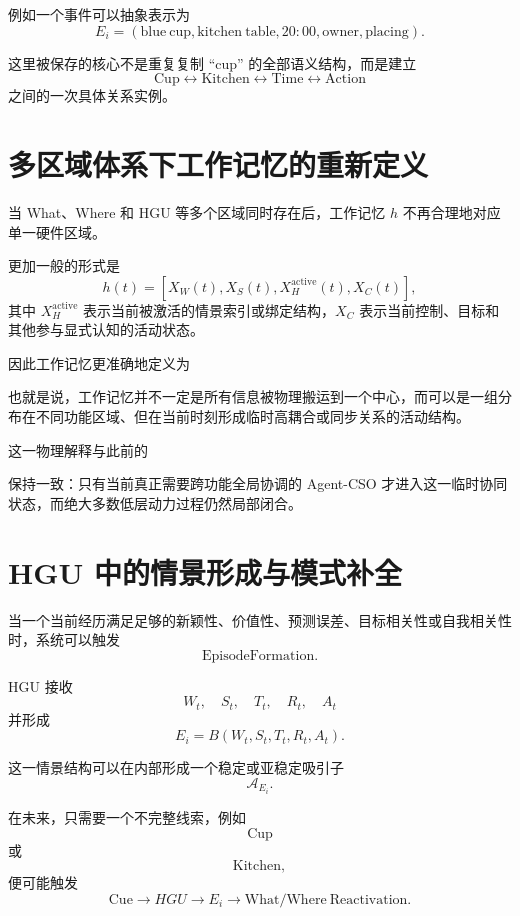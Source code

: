 例如一个事件可以抽象表示为
\[
E_i=
(
\mathrm{blue\ cup},
\mathrm{kitchen\ table},
20{:}00,
\mathrm{owner},
\mathrm{placing}
).
\]

这里被保存的核心不是重复复制 ``cup'' 的全部语义结构，而是建立
\[
\mathrm{Cup}
\leftrightarrow
\mathrm{Kitchen}
\leftrightarrow
\mathrm{Time}
\leftrightarrow
\mathrm{Action}
\]
之间的一次具体关系实例。

\section{多区域体系下工作记忆的重新定义}

当 What、Where 和 HGU 等多个区域同时存在后，工作记忆 $h$ 不再合理地对应单一硬件区域。

更加一般的形式是
\[
\boxed{
h(t)
=
[
X_W(t),
X_S(t),
X_H^{\mathrm{active}}(t),
X_C(t)
],
}
\]
其中 $X_H^{\mathrm{active}}$ 表示当前被激活的情景索引或绑定结构，$X_C$ 表示当前控制、目标和其他参与显式认知的活动状态。

因此工作记忆更准确地定义为
\begin{statementbox}
\centering
{}
\end{statementbox}

也就是说，工作记忆并不一定是所有信息被物理搬运到一个中心，而可以是一组分布在不同功能区域、但在当前时刻形成临时高耦合或同步关系的活动结构。

这一物理解释与此前的
\begin{statementbox}
\centering
{}
\end{statementbox}
保持一致：只有当前真正需要跨功能全局协调的 Agent-CSO 才进入这一临时协同状态，而绝大多数低层动力过程仍然局部闭合。

\section{HGU 中的情景形成与模式补全}

当一个当前经历满足足够的新颖性、价值性、预测误差、目标相关性或自我相关性时，系统可以触发
\[
\mathrm{EpisodeFormation}.
\]

HGU 接收
\[
W_t,\quad
S_t,\quad
T_t,\quad
R_t,\quad
A_t
\]
并形成
\[
\boxed{
E_i=B(W_t,S_t,T_t,R_t,A_t).
}
\]

这一情景结构可以在内部形成一个稳定或亚稳定吸引子
\[
\mathcal{A}_{E_i}.
\]

在未来，只需要一个不完整线索，例如
\[
\mathrm{Cup}
\]
或
\[
\mathrm{Kitchen},
\]
便可能触发
\[
\mathrm{Cue}
\rightarrow
HGU
\rightarrow
E_i
\rightarrow
\mathrm{What/Where\ Reactivation}.
\]

